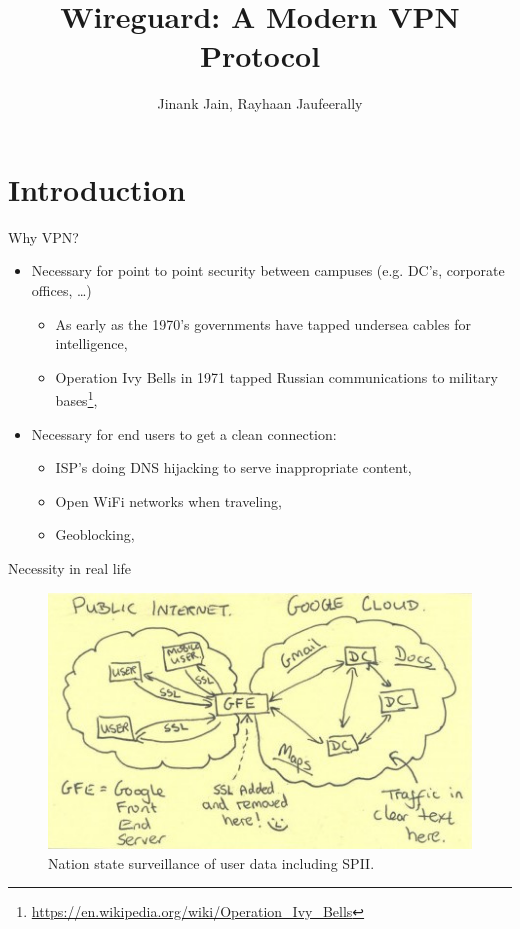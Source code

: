 \documentclass[xcolor=table]{beamer}
\title{Wireguard: A Modern VPN Protocol}
\author{Jinank Jain, Rayhaan Jaufeerally}
\institute{Network Security Group, ETH Z\"urich}
\begin{document}
    \maketitle
    \section{Introduction}
    \begin{frame}{Why VPN?}
        \begin{itemize}
            \item Necessary for point to point security between campuses (e.g. DC's, corporate offices, \ldots)
                \begin{itemize}
                    \item As early as the 1970's governments have tapped undersea cables for intelligence,
                    \item Operation Ivy Bells in 1971 tapped Russian communications to military bases\footnote{\url{https://en.wikipedia.org/wiki/Operation\_Ivy\_Bells}},
                \end{itemize}
            \item Necessary for end users to get a clean connection:
                \begin{itemize}
                    \item ISP's doing DNS hijacking to serve inappropriate content,
                    \item Open WiFi networks when traveling,
                    \item Geoblocking,
                \end{itemize}
        \end{itemize}
    \end{frame}
    \begin{frame}{Necessity in real life}
        \begin{figure}
            \includegraphics[width=\textwidth]{motivation.jpg}
            \caption{Nation state surveillance of user data including SPII.}
        \end{figure}
    \end{frame}
\end{document}
